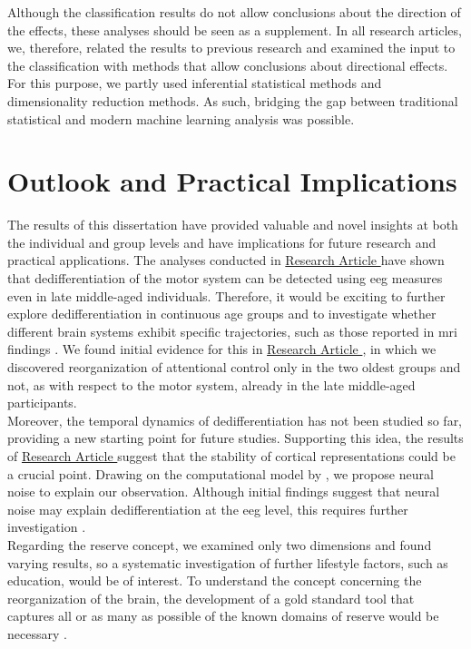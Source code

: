 Although the classification results do not allow conclusions about the direction of the effects, these analyses should be seen as a supplement. In all research articles, we, therefore, related the results to previous research and examined the input to the classification with methods that allow conclusions about directional effects. For this purpose, we partly used inferential statistical methods and dimensionality reduction methods. As such, bridging the gap between traditional statistical and modern machine learning analysis was possible.

\section{Outlook and Practical Implications}
The results of this dissertation have provided valuable and novel insights at both the individual and group levels and have implications for future research and practical applications. The analyses conducted in \hyperref[results:paperI]{Research Article } have shown that dedifferentiation of the motor system can be detected using \gls{eeg} measures even in late middle-aged individuals. Therefore, it would be exciting to further explore dedifferentiation in continuous age groups and to investigate whether different brain systems exhibit specific trajectories, such as those reported in \gls{mri} findings \cite{Raz2006}. We found initial evidence for this in \hyperref[results:paperII]{Research Article }, in which we discovered reorganization of attentional control only in the two oldest groups and not, as with respect to the motor system, already in the late middle-aged participants.\\
Moreover, the temporal dynamics of dedifferentiation has not been studied so far, providing a new starting point for future studies. Supporting this idea, the results of \hyperref[results:paperIII]{Research Article } suggest that the stability of cortical representations could be a crucial point. Drawing on the computational model by \citeauthor{Li2001} \cite{Li2001, Li2000}, we propose neural noise to explain our observation. Although initial findings suggest that neural noise may explain dedifferentiation at the \gls{eeg} level, this requires further investigation \cite{Pichot2022}.\\
Regarding the reserve concept, we examined only two dimensions and found varying results, so a systematic investigation of further lifestyle factors, such as education, would be of interest. To understand the concept concerning the reorganization of the brain, the development of a gold standard tool that captures all or as many as possible of the known domains of reserve would be necessary \cite{Nogueira2022}.\\
